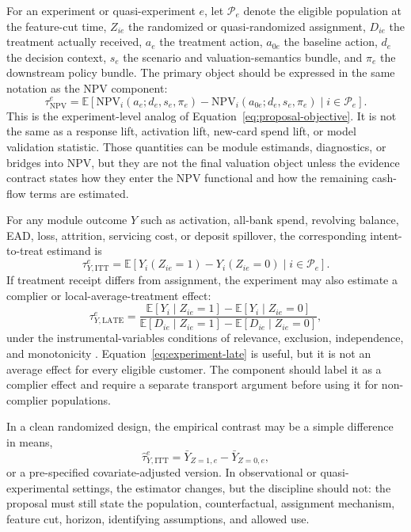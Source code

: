 \documentclass[11pt]{article}
\newcommand{\E}{\mathbb{E}}
\newcommand{\NPV}{\mathrm{NPV}}
\newcommand{\1}{\mathbf{1}}
\begin{document}
For an experiment or quasi-experiment $e$, let $\mathcal{P}_e$ denote the
eligible population at the feature-cut time, $Z_{ie}$ the randomized or
quasi-randomized assignment, $D_{ie}$ the treatment actually received, $a_e$
the treatment action, $a_{0e}$ the baseline action, $d_e$ the decision context,
$s_e$ the scenario and valuation-semantics bundle, and $\pi_e$ the downstream
policy bundle. The primary object should be expressed in the same notation as
the NPV component:
\begin{equation}
  \tau^{e}_{\NPV}
  =
  \E\!\left[
    \NPV_i(a_e;d_e,s_e,\pi_e)
    -
    \NPV_i(a_{0e};d_e,s_e,\pi_e)
    \mid i\in\mathcal{P}_e
  \right].
  \label{eq:experiment-npv-estimand}
\end{equation}
This is the experiment-level analog of
Equation~\eqref{eq:proposal-objective}. It is not the same as a response lift,
activation lift, new-card spend lift, or model validation statistic. Those
quantities can be module estimands, diagnostics, or bridges into NPV, but they
are not the final valuation object unless the evidence contract states how
they enter the NPV functional and how the remaining cash-flow terms are
estimated.

For any module outcome $Y$ such as activation, all-bank spend, revolving
balance, EAD, loss, attrition, servicing cost, or deposit spillover, the
corresponding intent-to-treat estimand is
\begin{equation}
  \tau^{e}_{Y,\mathrm{ITT}}
  =
  \E[Y_i(Z_{ie}=1)-Y_i(Z_{ie}=0)\mid i\in\mathcal{P}_e].
  \label{eq:experiment-itt}
\end{equation}
If treatment receipt differs from assignment, the experiment may also estimate
a complier or local-average-treatment effect:
\begin{equation}
  \tau^{e}_{Y,\mathrm{LATE}}
  =
  \frac{\E[Y_i\mid Z_{ie}=1]-\E[Y_i\mid Z_{ie}=0]}
       {\E[D_{ie}\mid Z_{ie}=1]-\E[D_{ie}\mid Z_{ie}=0]},
  \label{eq:experiment-late}
\end{equation}
under the instrumental-variables conditions of relevance, exclusion,
independence, and monotonicity
\citep{angristimbensrubin1996iv}. Equation~\eqref{eq:experiment-late} is
useful, but it is not an average effect for every eligible customer. The
component should label it as a complier effect and require a separate
transport argument before using it for non-complier populations.

In a clean randomized design, the empirical contrast may be a simple
difference in means,
\begin{equation}
  \widehat{\tau}^{e}_{Y,\mathrm{ITT}}
  =
  \bar{Y}_{Z=1,e}-\bar{Y}_{Z=0,e},
  \label{eq:experiment-contrast}
\end{equation}
or a pre-specified covariate-adjusted version. In observational or
quasi-experimental settings, the estimator changes, but the discipline should
not: the proposal must still state the population, counterfactual, assignment
mechanism, feature cut, horizon, identifying assumptions, and allowed use.
\end{document}

